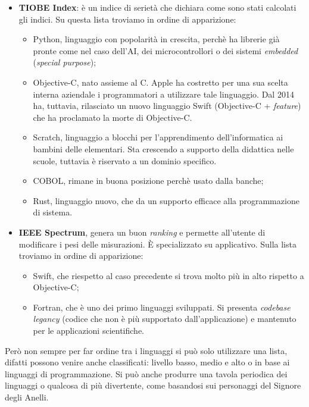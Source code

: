 \documentclass[10pt,a4paper]{book}
\begin{document}
\begin{itemize}
\item \textbf{TIOBE Index}: \`e un indice di seriet\`a che dichiara come sono stati calcolati gli indici. Su questa lista troviamo in ordine di apparizione:
\begin{itemize}
\item Python, linguaggio con popolarit\`a in crescita, perch\`e ha librerie gi\`a pronte come nel caso dell'AI, dei microcontrollori o dei sistemi \textit{embedded} (\textit{special purpose});
\item Objective-C, nato assieme al C. Apple ha costretto per una sua scelta interna aziendale i programmatori a utilizzare tale linguaggio. Dal 2014 ha, tuttavia, rilasciato un nuovo linguaggio Swift (Objective-C + \textit{feature}) che ha proclamato la morte di Objective-C.
\item Scratch, linguaggio a blocchi per l'apprendimento dell'informatica ai bambini delle elementari. Sta crescendo a supporto della didattica nelle scuole, tuttavia  \`e riservato a un dominio specifico.
\item COBOL, rimane in buona posizione perch\`e usato dalla banche;
\item Rust, linguaggio nuovo, che da un supporto efficace alla programmazione di sistema.
\end{itemize}
\item \textbf{IEEE Spectrum}, genera un buon \textit{ranking} e permette all'utente di modificare i pesi delle misurazioni. \`E specializzato su applicativo. Sulla lista troviamo in ordine di apparizione:
\begin{itemize}
\item Swift, che riespetto al caso precedente si trova molto pi\`u in alto rispetto a Objective-C;
\item Fortran, che \`e uno dei primo linguaggi sviluppati. Si presenta \textit{codebase legancy} (codice che non \`e pi\`u supportato dall'applicazione) e mantenuto per le applicazioni scientifiche.
\end{itemize}
\end{itemize}
\noindent
Per\`o non sempre per far ordine tra i linguaggi si pu\`o solo utilizzare una lista, difatti possono venire anche classificati: livello basso, medio e alto o in base ai linguaggi di programmazione. Si pu\`o anche produrre una tavola periodica dei linguaggi o  qualcosa di pi\`u divertente, come basandosi sui personaggi del Signore degli Anelli.\\\\
\end{document}
